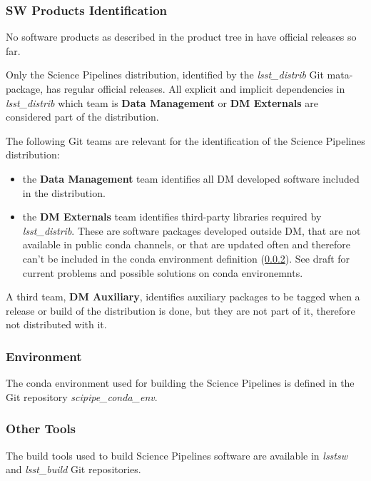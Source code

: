 \subsubsection{SW Products Identification} \label{sec:statusIdentification}

No software products as described in the product tree in  have official releases so far. 

Only the Science Pipelines distribution, identified by the \textit{lsst\_distrib} Git mata-package, has regular official releases.
All explicit and implicit dependencies in \textit{lsst\_distrib} which team is \textbf{Data Management} or \textbf{DM Externals} are considered part of the distribution.

The following Git teams are relevant for the identification of the Science Pipelines distribution:

\begin{itemize}
\item the \textbf{Data Management} team identifies all DM developed software included in the distribution.
\item the \textbf{DM Externals} team identifies third-party libraries required by \textit{lsst\_distrib}.
These are software packages developed outside DM, that are not available in public conda channels, or that are updated often and therefore can't be included in the conda environment definition (\ref{sec:statusEnvs}).
See draft  for current problems and possible solutions on conda environemnts.
\end{itemize}

A third team, \textbf{DM Auxiliary}, identifies auxiliary packages to be tagged when a release or build of the distribution is done, but they are not part of it, therefore not distributed with it.


\subsubsection{Environment} \label{sec:statusEnvs}

The conda environment used for building the Science Pipelines is defined in the Git repository \textit{scipipe\_conda\_env}.


\subsubsection{Other Tools} \label{sec:statusTools}

The build tools used to build Science Pipelines software are available in \textit{lsstsw} and \textit{lsst\_build} Git repositories.

